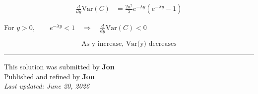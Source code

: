 \documentclass[12pt]{article}
\begin{document}
\begin{align*}
\frac{d}{dy}\mathrm{Var}(C)
&=\frac{2a^2}{\lambda}
e^{-\lambda y}\left(e^{-\lambda y}-1\right)
\end{align*}

For $y>0, \qquad e^{-\lambda y}<1
\quad\Longrightarrow\quad
\frac{d}{dy}\mathrm{Var}(C)<0$

$$\boxed{\text{As y increase, Var(y) decreases}}$$

\bigskip
\hrule
\begin{center}
    This solution was submitted by \textbf{Jon}\\[4pt]
    Published and refined by \textbf{Jon}\\[8pt]
    \textit{Last updated: June 20, 2026}
\end{center}
\end{document}
